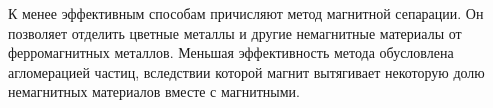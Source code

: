 \documentclass[14pt,oneside,final]{extreport}
\begin{document}
	К менее эффективным способам причисляют метод магнитной сепарации. Он позволяет отделить цветные металлы и другие немагнитные материалы от ферромагнитных металлов. Меньшая эффективность метода обусловлена агломерацией частиц, вследствии которой магнит вытягивает некоторую долю немагнитных материалов вместе с магнитными.   
	
	\renewcommand{\bibname}{\centerline{\large{Список литературы}}}
	 

	
\end{document}

